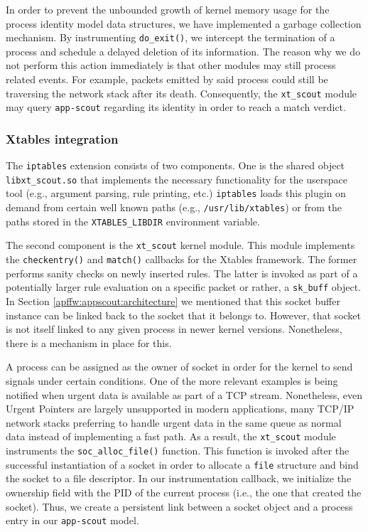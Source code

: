 In order to prevent the unbounded growth of kernel memory usage for the process
identity model data structures, we have implemented a garbage collection
mechanism. By instrumenting \texttt{do\_exit()}, we intercept the termination of
a process and schedule a delayed deletion of its information. The reason why we
do not perform this action immediately is that other modules may still process
related events. For example, packets emitted by said process could still be
traversing the network stack after its death. Consequently, the
\texttt{xt\_scout} module may query \texttt{app-scout} regarding its identity in
order to reach a match verdict.


\subsubsection{Xtables integration}

The \texttt{iptables} extension consists of two components. One is the shared
object \texttt{libxt\_scout.so} that implements the necessary functionality for
the userspace tool (e.g., argument parsing, rule printing, etc.)
\texttt{iptables} loads this plugin on demand from certain well known paths
(e.g., \texttt{/usr/lib/xtables}) or from the paths stored in the
\texttt{XTABLES\_LIBDIR} environment variable.

The second component is the \texttt{xt\_scout} kernel module. This module
implements the \texttt{checkentry()} and \texttt{match()} callbacks for the
Xtables framework. The former performs sanity checks on newly inserted rules.
The latter is invoked as part of a potentially larger rule evaluation on a
specific packet or rather, a \texttt{sk\_buff} object. In Section
\ref{apffw:appscout:architecture} we mentioned that this socket buffer instance can be
linked back to the socket that it belongs to. However, that socket is not itself
linked to any given process in newer kernel versions. Nonetheless, there is a
mechanism in place for this.

A process can be assigned as the owner of socket in order for the kernel to send
signals under certain conditions. One of the more relevant examples is being
notified when urgent data is available as part of a TCP stream. Nonetheless,
even Urgent Pointers are largely unsupported in modern applications, many TCP/IP
network stacks preferring to handle urgent data in the same queue as normal data
instead of implementing a fast path. As a result, the \texttt{xt\_scout} module
instruments the \texttt{soc\_alloc\_file()} function. This function is invoked
after the successful instantiation of a socket in order to allocate a
\texttt{file} structure and bind the socket to a file descriptor. In our
instrumentation callback, we initialize the ownership field with the PID of the
current process (i.e., the one that created the socket). Thus, we create a
persistent link between a socket object and a process entry in our
\texttt{app-scout} model.

